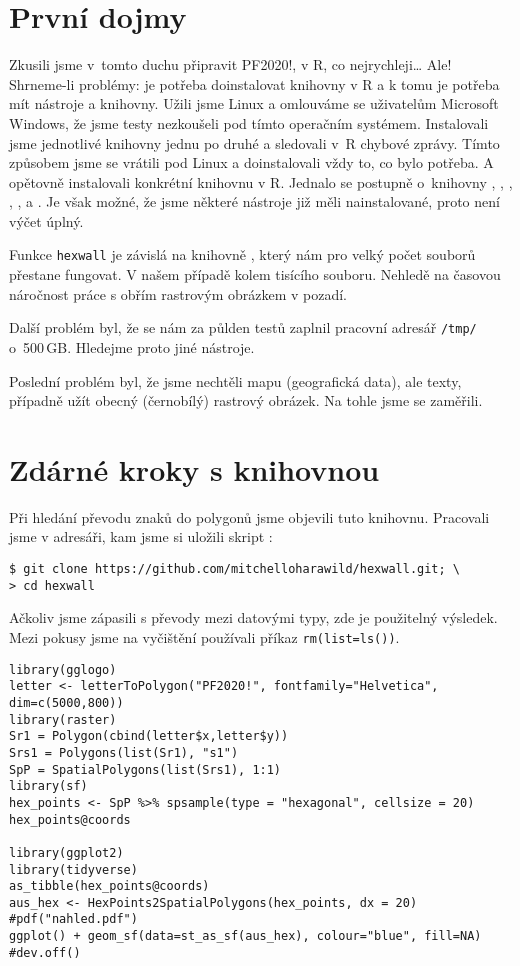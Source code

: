 \section{První dojmy}
Zkusili jsme v~tomto duchu připravit PF2020!, v R, co nejrychleji\ldots{} Ale!
Shrneme-li problémy: je potřeba doinstalovat knihovny v R a k tomu je potřeba mít nástroje a knihovny. Užili jsme Linux a omlouváme se uživatelům Microsoft Windows, že jsme testy nezkoušeli pod tímto operačním systémem. Instalovali jsme jednotlivé knihovny jednu po druhé a sledovali v~R chybové zprávy. Tímto způsobem jsme se vrátili pod Linux a doinstalovali vždy to, co bylo potřeba. A opětovně instalovali konkrétní knihovnu v R. Jednalo se postupně o~knihovny 
, 
,
, 
, 
,
 a
.
Je však možné, že jsme některé nástroje již měli nainstalované, proto není výčet úplný.

Funkce \texttt{hexwall} je závislá na knihovně , který nám pro velký počet souborů přestane fungovat. V našem případě kolem tisícího souboru. Nehledě na časovou náročnost práce s obřím rastrovým obrázkem v pozadí. 

Další problém byl, že se nám za půlden testů zaplnil pracovní adresář \texttt{/tmp/} o~500\,GB. Hledejme proto jiné nástroje.

Poslední problém byl, že jsme nechtěli mapu (geografická data), ale texty, případně užít obecný (černobílý) rastrový obrázek. Na tohle jsme se zaměřili.

\section{Zdárné kroky s knihovnou }
Při hledání převodu znaků do polygonů jsme objevili tuto knihovnu. Pracovali jsme v adresáři, kam jsme si uložili skript :

\begin{lstlisting}
$ git clone https://github.com/mitchelloharawild/hexwall.git; \
> cd hexwall
\end{lstlisting}

Ačkoliv jsme zápasili s převody mezi datovými typy, zde je použitelný výsledek. Mezi pokusy jsme na vyčištění používali příkaz \texttt{rm(list=ls())}. 

\begin{lstlisting}
library(gglogo)
letter <- letterToPolygon("PF2020!", fontfamily="Helvetica", dim=c(5000,800))
library(raster)
Sr1 = Polygon(cbind(letter$x,letter$y))
Srs1 = Polygons(list(Sr1), "s1")
SpP = SpatialPolygons(list(Srs1), 1:1)
library(sf)
hex_points <- SpP %>% spsample(type = "hexagonal", cellsize = 20)
hex_points@coords

library(ggplot2)
library(tidyverse)
as_tibble(hex_points@coords)
aus_hex <- HexPoints2SpatialPolygons(hex_points, dx = 20)
#pdf("nahled.pdf")
ggplot() + geom_sf(data=st_as_sf(aus_hex), colour="blue", fill=NA)
#dev.off()
\end{lstlisting}

